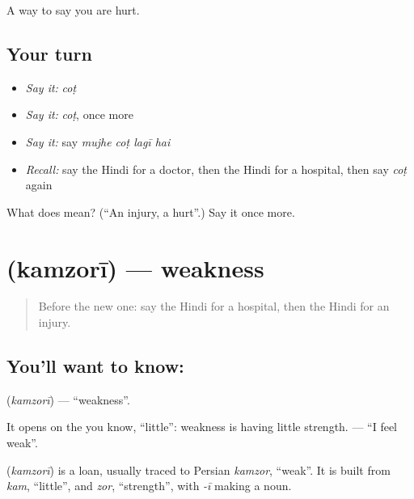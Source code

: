 \begin{grammarlens}[title={What you've built}]
A way to say you are hurt.
\end{grammarlens}

\subsection*{Your turn}
\begin{itemize}
\raggedright
  \item \emph{Say it:} \emph{coṭ}
  \item \emph{Say it:} \emph{coṭ}, once more
  \item \emph{Say it:} say \emph{mujhe coṭ lagī hai}
  \item \emph{Recall:} say the Hindi for a doctor, then the Hindi for a hospital, then say \emph{coṭ} again
\end{itemize}

\begin{tcolorbox}[breakable,colback=teal!4,colframe=teal!35!black,title={Before you move on}]
What does  mean? (\textquotedblleft{}An injury, a hurt\textquotedblright{}.) Say it once more.
\end{tcolorbox}
\section[\texorpdfstring{\hi{कमज़ोरी} (kamzorī)}{कमज़ोरी (kamzorī)}]{ (kamzorī) — weakness}

\label{lesson:HI-C107-kamzori}



\begin{quote}
Before the new one: say the Hindi for a hospital, then the Hindi for an injury.
\end{quote}

\subsection*{You'll want to know: }
\textbf{} (\emph{kamzorī}) — \textquotedblleft{}weakness\textquotedblright{}.

It opens on the \textbf{} you know, \textquotedblleft{}little\textquotedblright{}: weakness is having little strength. \textbf{   } — \textquotedblleft{}I feel weak\textquotedblright{}.

\begin{cousinweb}
\textbf{} (\emph{kamzorī}) is a loan, usually traced to Persian \emph{kamzor}, \textquotedblleft{}weak\textquotedblright{}. It is built from \emph{kam}, \textquotedblleft{}little\textquotedblright{}, and \emph{zor}, \textquotedblleft{}strength\textquotedblright{}, with \emph{-ī} making a noun.
\end{cousinweb}

